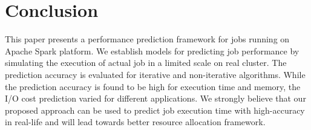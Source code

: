 \section{Conclusion}
\label{conclusion}

\noindent
This paper presents a performance prediction framework for jobs running on Apache Spark platform. We establish models for predicting job performance by simulating the execution of actual job in a limited scale on real cluster. The prediction accuracy is evaluated for iterative and non-iterative algorithms. While the prediction accuracy is found to be high for execution time and memory, the I/O cost prediction varied for different applications. We strongly believe that our proposed approach can be used to predict job execution time with high-accuracy in real-life and will lead towards better resource allocation framework.  


